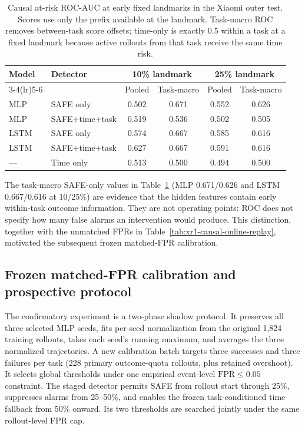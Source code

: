 \documentclass[11pt,a4paper]{article}
\begin{document}
\begin{table}[H]
\centering
\caption{Causal at-risk ROC-AUC at early fixed landmarks in the Xiaomi outer
test. Scores use only the prefix available at the landmark. Task-macro ROC
removes between-task score offsets; time-only is exactly 0.5 within a task at a
fixed landmark because active rollouts from that task receive the same time
risk.}
\label{tab:xr1-causal-landmarks}
\begin{tabular}{llcccc}
\toprule
Model & Detector & \multicolumn{2}{c}{10\% landmark} & \multicolumn{2}{c}{25\% landmark}\\
\cmidrule(lr){3-4}\cmidrule(lr){5-6}
& & Pooled & Task-macro & Pooled & Task-macro\\
\midrule
MLP & SAFE only & 0.502 & 0.671 & 0.552 & 0.626\\
MLP & SAFE+time+task & 0.519 & 0.536 & 0.502 & 0.505\\
LSTM & SAFE only & 0.574 & 0.667 & 0.585 & 0.616\\
LSTM & SAFE+time+task & 0.627 & 0.667 & 0.591 & 0.616\\
--- & Time only & 0.513 & 0.500 & 0.494 & 0.500\\
\bottomrule
\end{tabular}
\end{table}

The task-macro SAFE-only values in Table~\ref{tab:xr1-causal-landmarks}
(MLP 0.671/0.626 and LSTM 0.667/0.616 at 10/25\%) are evidence that the hidden
features contain early within-task outcome information. They are not operating
points: ROC does not specify how many false alarms an intervention would
produce. This distinction, together with the unmatched FPRs in
Table~\ref{tab:xr1-causal-online-replay}, motivated the subsequent frozen
matched-FPR calibration.

\subsection{Frozen matched-FPR calibration and prospective protocol}
The confirmatory experiment is a two-phase shadow protocol. It preserves all
three selected MLP seeds, fits per-seed normalization from the original 1,824
training rollouts, takes each seed's running maximum, and averages the three
normalized trajectories. A new calibration batch targets three successes and
three failures per task (228 primary outcome-quota rollouts, plus retained
overshoot). It
selects global thresholds under one empirical event-level
$\mathrm{FPR}\leq0.05$ constraint. The staged detector permits SAFE from rollout
start through 25\%, suppresses alarms from 25--50\%, and enables the frozen
task-conditioned time fallback from 50\% onward. Its two thresholds are searched
jointly under the same rollout-level FPR cap.
\end{document}
